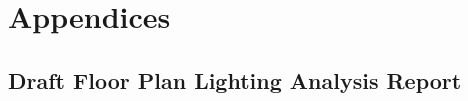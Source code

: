 \section{Appendices}

\subsection{Draft Floor Plan Lighting Analysis Report}

\label{appenddix:DraftFloorPlanLighting}

